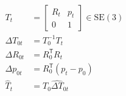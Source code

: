 \documentclass[border=7pt]{standalone}
\begin{document}
\color{ink}
$\displaystyle \begin{aligned}T_t&=\begin{bmatrix}R_t&p_t\\0&1\end{bmatrix}\in\mathrm{SE}(3)\\ \Delta T_{0t}&=T_0^{-1}T_t\\ \Delta R_{0t}&=R_0^{\mathsf T}R_t\\ \Delta p_{0t}&=R_0^{\mathsf T}(p_t-p_0)\\ \widehat T_t&=T_0\widehat{\Delta T}_{0t}\end{aligned}$
\end{document}

